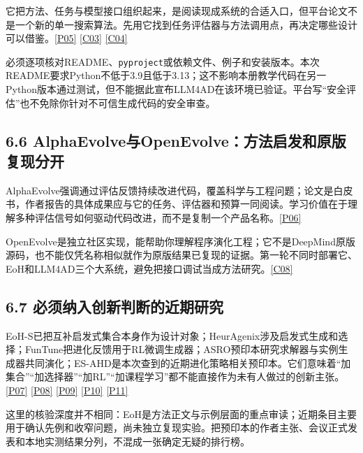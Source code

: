 它把方法、任务与模型接口组织起来，是阅读现成系统的合适入口，但平台论文不是一个新的单一搜索算法。先用它找到任务评估器与方法调用点，再决定哪些设计可以借鉴。\href{https://arxiv.org/abs/2412.17287v2}{{[}P05{]}}
\href{https://github.com/Optima-CityU/LLM4AD}{{[}C03{]}}
\href{https://llm4ad-doc.readthedocs.io/en/latest/}{{[}C04{]}}

必须逐项核对README、\texttt{pyproject}或依赖文件、例子和安装版本。本次README要求Python不低于3.9且低于3.13；这不影响本册教学代码在另一Python版本通过测试，但不能据此宣布LLM4AD在该环境已验证。平台写``安全评估''也不免除你针对不可信生成代码的安全审查。

\subsection{6.6
AlphaEvolve与OpenEvolve：方法启发和原版复现分开}\label{alphaevolveux4e0eopenevolveux65b9ux6cd5ux542fux53d1ux548cux539fux7248ux590dux73b0ux5206ux5f00}

AlphaEvolve强调通过评估反馈持续改进代码，覆盖科学与工程问题；论文是白皮书，作者报告的具体成果应与它的任务、评估器和预算一同阅读。学习价值在于理解多种评估信号如何驱动代码改进，而不是复制一个产品名称。\href{https://arxiv.org/abs/2506.13131}{{[}P06{]}}

OpenEvolve是独立社区实现，能帮助你理解程序演化工程；它不是DeepMind原版源码，也不能仅凭名称相似就作为原版结果已复现的证据。第一轮不同时部署它、EoH和LLM4AD三个大系统，避免把接口调试当成方法研究。\href{https://github.com/algorithmicsuperintelligence/openevolve}{{[}C08{]}}

\subsection{6.7
必须纳入创新判断的近期研究}\label{ux5fc5ux987bux7eb3ux5165ux521bux65b0ux5224ux65adux7684ux8fd1ux671fux7814ux7a76}

EoH-S已把互补启发式集合本身作为设计对象；HeurAgenix涉及启发式生成和选择；FunTune把进化反馈用于RL微调生成器；ASRO预印本研究求解器与实例生成器共同演化；ES-AHD是本次查到的近期进化策略相关预印本。它们意味着``加集合''``加选择器''``加RL''``加课程学习''都不能直接作为未有人做过的创新主张。\href{https://ojs.aaai.org/index.php/AAAI/article/view/41038}{{[}P07{]}}
\href{https://arxiv.org/abs/2504.05108}{{[}P08{]}}
\href{https://arxiv.org/abs/2506.15196}{{[}P09{]}}
\href{https://arxiv.org/abs/2601.22896}{{[}P10{]}}
\href{https://arxiv.org/abs/2609.00023}{{[}P11{]}}

这里的核验深度并不相同：EoH是方法正文与示例层面的重点审读；近期条目主要用于确认先例和收窄问题，尚未独立复现实验。把预印本的作者主张、会议正式发表和本地实测结果分列，不混成一张确定无疑的排行榜。

